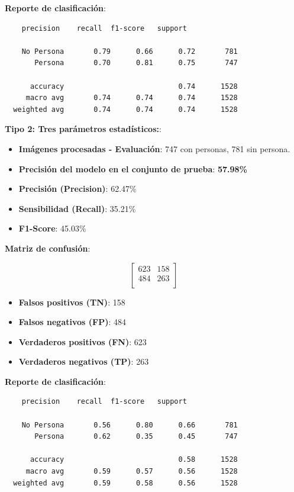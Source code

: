 \documentclass[a4paper]{article}
\begin{document}
\textbf{Reporte de clasificación}:

\begin{verbatim}
    precision    recall  f1-score   support

    No Persona       0.79      0.66      0.72       781
       Persona       0.70      0.81      0.75       747
  
      accuracy                           0.74      1528
     macro avg       0.74      0.74      0.74      1528
  weighted avg       0.74      0.74      0.74      1528
\end{verbatim}

\vspace{0.5cm}
\textbf{Tipo 2: Tres parámetros estadísticos:}:

\begin{itemize}
    \item \textbf{Imágenes procesadas - Evaluación}: 747 con personas, 781 sin persona.
    \item \textbf{Precisión del modelo en el conjunto de prueba}: \textbf{57.98\%}
    \item \textbf{Precisión (Precision)}: 62.47\%
    \item \textbf{Sensibilidad (Recall)}: 35.21\%
    \item \textbf{F1-Score}: 45.03\%
\end{itemize}

\textbf{Matriz de confusión}:

\[
\begin{bmatrix}
    623 & 158 \\
    484 & 263 \\
\end{bmatrix}
\]

\begin{itemize}
    \item \textbf{Falsos positivos (TN)}: 158
    \item \textbf{Falsos negativos (FP)}: 484
    \item \textbf{Verdaderos positivos (FN)}: 623
    \item \textbf{Verdaderos negativos (TP)}: 263
\end{itemize}

\textbf{Reporte de clasificación}:

\begin{verbatim}
    precision    recall  f1-score   support

    No Persona       0.56      0.80      0.66       781
       Persona       0.62      0.35      0.45       747
  
      accuracy                           0.58      1528
     macro avg       0.59      0.57      0.56      1528
  weighted avg       0.59      0.58      0.56      1528
\end{verbatim}
\vspace{0.5cm}
\end{document}
